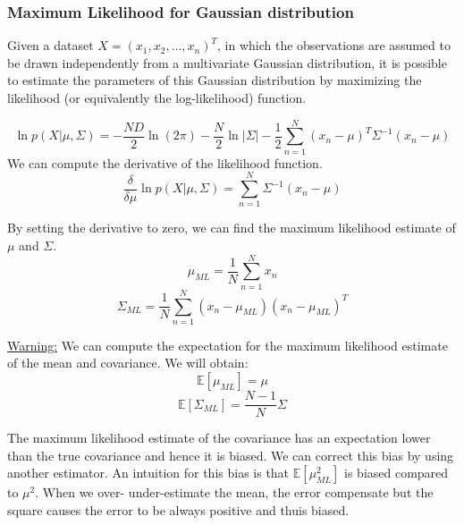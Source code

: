 \subsubsection{Maximum Likelihood for Gaussian distribution}
Given a dataset $X = (x_1, x_2, \dots, x_n)^T$, in which the observations are assumed to be drawn independently from a multivariate Gaussian distribution, it is possible to estimate the parameters of this Gaussian distribution by maximizing the likelihood (or equivalently the log-likelihood) function.

\begin{equation}
    \ln{p(X|\mu, \Sigma)} = -\frac{ND}{2}\ln{(2\pi)}-\frac{N}{2}\ln{|\Sigma|}-\frac{1}{2}\sum_{n=1}^{N} (x_n - \mu)^T \Sigma^{-1} (x_n - \mu)
\end{equation}
We can compute the derivative of the likelihood function.
\begin{equation}
    \frac{\delta}{\delta \mu} \ln{p(X|\mu, \Sigma)} = \sum_{n=1}^{N} \Sigma^{-1} (x_n - \mu)
\end{equation}

By setting the derivative to zero, we can find the maximum likelihood estimate of $\mu$ and $\Sigma$.
\begin{equation}
    \mu_ {ML} = \frac{1}{N}\sum_{n=1}^{N} x_n
\end{equation}
\begin{equation}
    \Sigma_{ML} = \frac{1}{N} \sum_{n=1}^{N} (x_n - \mu_{ML})(x_n - \mu_{ML})^T
\end{equation}

\underline{Warning:} We can compute the expectation for the maximum likelihood estimate of the mean and covariance. We will obtain:
\begin{equation}
    \mathbb{E}[\mu_ {ML}] = \mu
\end{equation}
\begin{equation}
    \mathbb{E}[\Sigma_{ML}] = \frac{N-1}{N}\Sigma
\end{equation}

The maximum likelihood estimate of the covariance has an expectation lower than the true covariance and hence it is biased. We can correct this bias by using another estimator.
An intuition for this bias is that $\mathbb{E}[\mu_{ML}^2]$ is biased compared to $\mu^2$. When we over- under-estimate the mean, the error compensate but the square causes the error to be always positive and thuis biased.